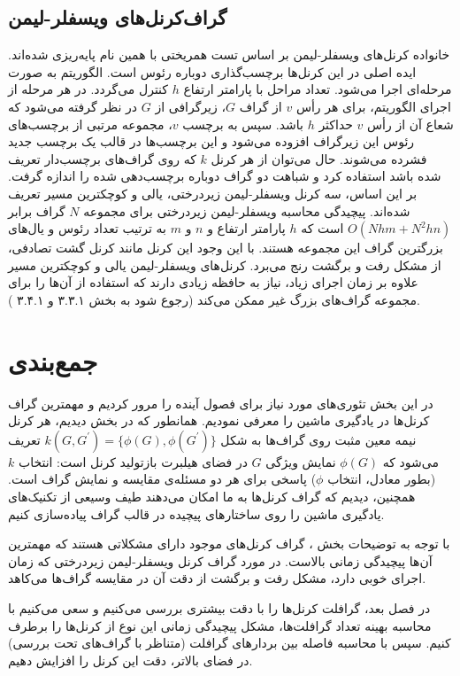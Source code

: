 \subsection{گراف‌کرنل‌های ویسفلر-لیمن}
 خانواده کرنل‌های ویسفلر-لیمن بر اساس تست همریختی با همین نام پایه‌ریزی شده‌اند. ایده اصلی در این کرنل‌ها برچسب‌گذاری دوباره رئوس است. الگوریتم به صورت مرحله‌ای اجرا می‌شود. تعداد مراحل با پارامتر ارتفاع $h$ کنترل می‌گردد. در هر مرحله از اجرای الگوریتم، برای هر رأس $v$ از گراف $G$، زیرگرافی از $G$ در نظر گرفته می‌شود که شعاع آن از رأس $v$ حداکثر $h$ باشد. سپس به برچسب $v$، مجموعه مرتبی از برچسب‌های رئوس این زیرگراف افزوده می‌شود و این برچسب‌ها در قالب یک برچسب جدید فشرده می‌شوند. حال می‌توان از هر کرنل $k$ که روی گراف‌های برچسب‌دار تعریف شده باشد استفاده کرد و شباهت دو گراف دوباره برچسب‌دهی شده را اندازه گرفت. بر این اساس، سه کرنل ویسفلر-لیمن زیردرختی، یالی و کوچکترین مسیر تعریف شده‌اند. پیچیدگی محاسبه ویسفلر-لیمن زیردرختی برای مجموعه $N$ گراف برابر  $O(Nhm+N^2hn)$ است که $h$ پارامتر ارتفاع و $n$ و $m$ به ترتیب تعداد رئوس و یال‌های بزرگترین گراف این مجموعه هستند. با این وجود این کرنل مانند کرنل گشت تصادفی، از مشکل رفت و برگشت رنج می‌برد. کرنل‌های ویسفلر-لیمن یالی و کوچکترین مسیر علاوه بر زمان اجرای زیاد، نیاز به حافظه زیادی دارند که استفاده از آن‌ها را برای مجموعه گراف‌های بزرگ غیر ممکن می‌کند (رجوع شود به بخش ۳.۳.۱ و ۳.۴.۱ ).
 
\section{جمع‌بندی}
در این بخش تئوری‌های مورد نیاز برای فصول آینده را مرور کردیم و مهمترین گراف کرنل‌ها در یادگیری ماشین را معرفی نمودیم. همانطور که در بخش‌  دیدیم، هر کرنل نیمه معین مثبت روی گراف‌ها به شکل $k(G,G^\prime) = \lbrace{\phi(G),\phi(G^\prime)}\rbrace$ تعریف می‌شود که $\phi(G)$ نمایش ویژگی $G$ در فضای هیلبرت بازتولید کرنل است: انتخاب $k$ (بطور معادل، انتخاب $\phi$) پاسخی برای هر دو مسئله‌ی مقایسه و نمایش گراف است. همچنین، دیدیم که گراف کرنل‌ها به ما امکان می‌دهند طیف وسیعی از تکنیک‌های یادگیری ماشین را روی ساختارهای پیچیده در قالب گراف پیاده‌سازی کنیم.

با توجه به توضیحات بخش ، گراف کرنل‌های موجود دارای مشکلاتی هستند که مهمترین آن‌ها پیچیدگی زمانی بالاست. در مورد گراف کرنل ویسفلر-لیمن زیردرختی که زمان اجرای خوبی دارد، مشکل رفت و برگشت از دقت آن در مقایسه گراف‌ها می‌کاهد.

در فصل بعد، گرافلت کرنل‌ها را با دقت بیشتری بررسی می‌کنیم و سعی می‌کنیم با محاسبه بهینه تعداد گرافلت‌ها، مشکل پیچیدگی زمانی این نوع از کرنل‌ها را برطرف کنیم. سپس با محاسبه فاصله بین بردارهای گرافلت (متناظر با گراف‌های تحت بررسی) در فضای بالاتر، دقت این کرنل را افزایش دهیم.